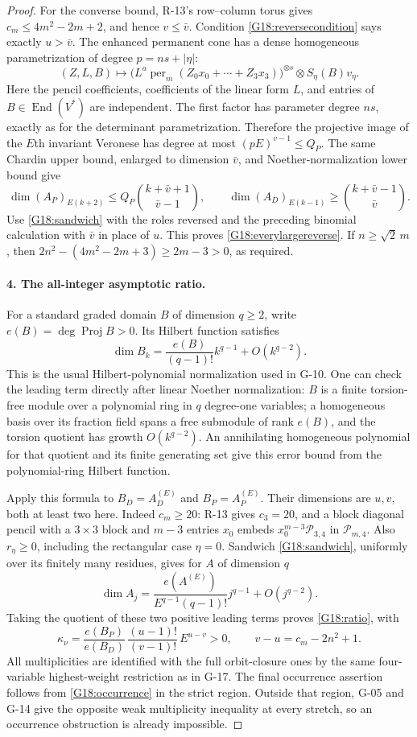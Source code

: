 \begin{proof}
For the converse bound, R-13's row--column torus gives
$c_m\leq4m^2-2m+2$, and hence $v\leq\bar v$.
Condition \eqref{G18:reversecondition} says exactly $u>\bar v$.
The enhanced permanent cone has a dense homogeneous
parametrization of degree $p=ns+|\eta|$:
\[
 (Z,L,B)\longmapsto
 \bigl(L^a\operatorname{per}_m(Z_0x_0+\cdots+Z_3x_3)\bigr)^{\otimes s}
       \otimes S_\eta(B)v_\eta.
\]
Here the pencil coefficients, coefficients of the linear form $L$,
and entries of $B\in\operatorname{End}(V^*)$ are independent.
The first factor has parameter degree $ns$, exactly as for the
determinant parametrization. Therefore the projective image of
the $E$th invariant Veronese has degree at most
$(pE)^{v-1}\leq Q_P$. The same Chardin upper bound, enlarged to
dimension $\bar v$, and Noether-normalization lower bound give
\[
 \dim(A_P)_{E(k+2)}\leq Q_P\binom{k+\bar v+1}{\bar v-1},
 \qquad
 \dim(A_D)_{E(k-1)}\geq\binom{k+\bar v-1}{\bar v}.
\]
Use \eqref{G18:sandwich} with the roles reversed and the preceding
binomial calculation with $\bar v$ in place of $u$.
This proves \eqref{G18:everylargereverse}. If
$n\geq\sqrt2\,m$, then
$2n^2-(4m^2-2m+3)\geq2m-3>0$, as required.

\paragraph{4. The all-integer asymptotic ratio.}
For a standard graded domain $B$ of dimension $q\geq2$, write
$e(B)=\deg\operatorname{Proj}B>0$. Its Hilbert function satisfies
\[
 \dim B_k=\frac{e(B)}{(q-1)!}k^{q-1}+O(k^{q-2}).
\]
This is the usual Hilbert-polynomial normalization used in G-10.
One can check the leading term directly after linear Noether
normalization: $B$ is a finite torsion-free module over a polynomial
ring in $q$ degree-one variables; a homogeneous basis over its
fraction field spans a free submodule of rank $e(B)$, and the
torsion quotient has growth $O(k^{q-2})$. An annihilating homogeneous
polynomial for that quotient and its finite generating set give
this error bound from the polynomial-ring Hilbert function.

Apply this formula to $B_D=A_D^{(E)}$ and $B_P=A_P^{(E)}$.
Their dimensions are $u,v$, both at least two here. Indeed
$c_m\geq20$: R-13 gives $c_3=20$, and a block diagonal pencil
with a $3\times3$ block and $m-3$ entries $x_0$ embeds
$x_0^{m-3}\mathcal P_{3,4}$ in $\mathcal P_{m,4}$.
Also $r_\eta\geq0$, including the rectangular case $\eta=0$.
Sandwich
\eqref{G18:sandwich}, uniformly over its finitely many residues,
gives for $A$ of dimension $q$
\[
 \dim A_j=\frac{e(A^{(E)})}{E^{q-1}(q-1)!}
                 j^{q-1}+O(j^{q-2}).
\]
Taking the quotient of these two positive leading terms proves
\eqref{G18:ratio}, with
\[
 \kappa_\nu=
 \frac{e(B_P)}{e(B_D)}\,
 \frac{(u-1)!}{(v-1)!}\,E^{u-v}>0,
 \qquad v-u=c_m-2n^2+1.
\]
All multiplicities are identified with the full orbit-closure
ones by the same four-variable highest-weight restriction as in
G-17. The final occurrence assertion follows from
\eqref{G18:occurrence} in the strict region. Outside that region,
G-05 and G-14 give the opposite weak multiplicity inequality at
every stretch, so an occurrence obstruction is already impossible.
\end{proof}

